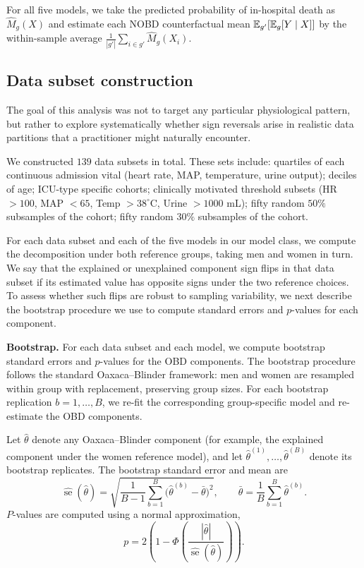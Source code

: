For all five models, we take the predicted probability of in-hospital death as $\hat{M}_g(X)$ and estimate each NOBD counterfactual mean $\mathbb{E}_{g'}[\mathbb{E}_g[Y \mid X]]$ by the within-sample average $\frac{1}{|g'|}\sum_{i \in g'} \hat{M}_g(X_i)$.

\subsection*{Data subset construction}
The goal of this analysis was not to target any particular physiological pattern, but rather to explore systematically whether sign reversals arise in realistic data partitions that a practitioner might naturally encounter.

We constructed $139$ data subsets in total. These sets include: quartiles of each continuous admission vital (heart rate, MAP, temperature, urine output);
deciles of age; ICU-type specific cohorts; clinically motivated threshold subsets (HR $>100$, MAP $<65$, Temp $> 38^\circ$C, Urine $>1000$ mL); fifty random $50\%$ subsamples of the cohort; fifty random $30\%$ subsamples of the cohort.

For each data subset and each of the five models in our model class, we compute the decomposition under both reference groups, taking men and women in turn. We say that the explained or unexplained component sign flips in that data subset if its estimated value has opposite signs under the two reference choices. To assess whether such flips are robust to sampling variability, we next describe the bootstrap procedure we use to compute standard errors and $p$-values for each component.

\textbf{Bootstrap.}
For each data subset and each model, we compute bootstrap standard errors and $p$-values for the OBD components. The bootstrap procedure follows the standard Oaxaca--Blinder framework: men and women are resampled within group with replacement, preserving group sizes. For each bootstrap replication $b=1,\dots,B$, we re-fit the corresponding group-specific model and re-estimate the OBD components.

Let $\hat\theta$ denote any Oaxaca--Blinder component (for example, the explained component under the women reference model), and let $\hat\theta^{(1)},\dots,\hat\theta^{(B)}$ denote its bootstrap replicates. The bootstrap standard error and mean are
\[
    \widehat{\operatorname{se}}(\hat\theta)
    =
    \sqrt{
    \frac{1}{B-1}\sum_{b=1}^B
    \bigl(\hat\theta^{(b)} - \bar\theta\bigr)^2
    },
    \qquad
    \bar\theta = \frac{1}{B}\sum_{b=1}^B \hat\theta^{(b)}.
\]
$P$-values are computed using a normal approximation,
\[
    p = 2\left(1 - \Phi\left(\frac{|\hat\theta|}{\widehat{\operatorname{se}}(\hat\theta)}\right)\right).
\]

